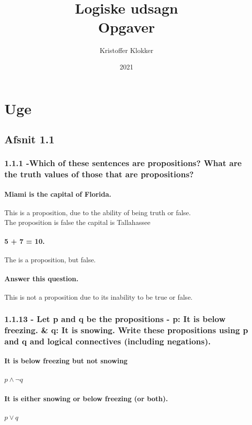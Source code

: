 \documentclass[12pt, a4paper]{report}
\title{Logiske udsagn\\Opgaver}
\author{Kristoffer Klokker}
\date{2021}
\begin{document}
	\maketitle
	\tableofcontents
	\clearpage
	\setcounter{chapter}{35}	
	\chapter{Uge}
		\section{Afsnit 1.1}
			\subsection{1.1.1 -Which of these sentences are propositions? What are the truth values of those that are propositions?}
				\setcounter{subsubsection}{1}
				\subsubsection{Miami is the capital of Florida.}
					This is a proposition, due to the ability of being truth or false.\\
					The proposition is false the capital is Tallahassee
				\setcounter{subsubsection}{2}
				\subsubsection{5 + 7 = 10.}
					The is a proposition, but false.
				\setcounter{subsubsection}{5}
				\subsubsection{Answer this question.}
					This is not a proposition due to its inability to be true or false.
			\setcounter{subsection}{12}
			\subsection{1.1.13 - Let p and q be the propositions - p: It is below freezing. \& q: It is snowing. Write these propositions using p and q and logical connectives (including negations).}
				\setcounter{subsubsection}{1}
				\subsubsection{It is below freezing but not snowing}
					$p \land \neg q$
				\setcounter{subsubsection}{2}
				\subsubsection{It is either snowing or below freezing (or both).}
					$p \lor q$
				\setcounter{subsubsection}{5}
\end{document}
